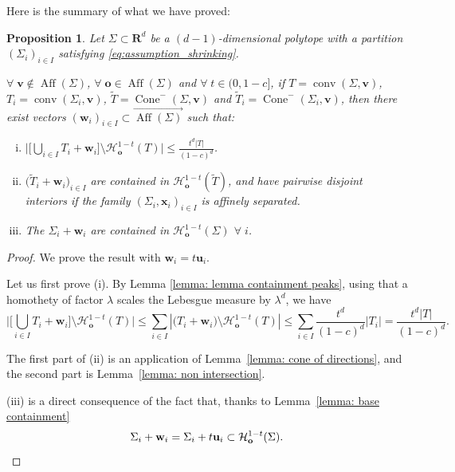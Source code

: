 \documentclass[10pt]{amsart}
\newcommand{\R}{\mathbf{R}}
\newcommand{\ocone}[2]{\operatorname{Cone}^-(#1,#2)}
\newtheorem{proposition}[theorem]{Proposition}
\begin{document}
Here is the summary of what we have proved:
\begin{proposition}\label{prop: base case}
Let $\Sigma \subset \R^d$ be a  $(d-1)$-dimensional polytope with a partition $(\Sigma_i)_{i \in I}$ satisfying \eqref{eq:assumption_shrinking}. 

$ \forall\;\mathbf{v}\notin \operatorname{Aff}(\Sigma)$, $\forall\;\mathbf{o}\in \operatorname{Aff}(\Sigma)$ and $\forall\;t\in (0,1-c]$, if $T=\operatorname{conv}(\Sigma, \mathbf{v})$, $T_i=\operatorname{conv}(\Sigma_i, \mathbf{v})$, $\widetilde{T}=\ocone{\Sigma}{\mathbf{v}}$ and $\widetilde{T}_i=\ocone{\Sigma_i}{\mathbf{v}}$, then there exist vectors $(\mathbf{w}_i)_{i\in I}\subset \overrightarrow{\operatorname{Aff}(\Sigma)}$ such that:
\begin{enumerate}[(i)]
    \item $\displaystyle \bigg|\bigg[\bigcup_{i\in I} T_i+\mathbf{w}_i\bigg]\setminus \mathcal{H}^{1-t}_\mathbf{o}(T)\bigg|\leq \frac{t^d|T|}{(1-c)^d} $.
    \item $\displaystyle \big(\widetilde{T}_i+\mathbf{w}_i\big)_{i\in I}$ are contained in $\mathcal{H}_\mathbf{o}^{1-t}(\widetilde{T})$, and have pairwise disjoint interiors if the family $(\Sigma_i,\mathbf{x}_i)_{i \in I}$ is affinely separated.
    \item The $\Sigma_i+
    \mathbf{w}_i$ are contained in $\mathcal{H}_\mathbf{o}^{1-t}(\Sigma)$ $\forall\;i$.
\end{enumerate}
\end{proposition}
\begin{proof}
We prove the result with $\mathbf{w}_i = t\mathbf{u}_i$.

Let us first prove (i). By Lemma \ref{lemma: lemma containment peaks}, using that a homothety of factor $\lambda$ scales the Lebesgue measure by $\lambda^d$, we have
\begin{equation*}
     \bigg|\bigg[\bigcup_{i\in I} 
     T_i+\mathbf{w}_{i}\bigg]\setminus \mathcal{H}^{1-t}_\mathbf{o}(T)\bigg|\leq \sum_{i\in I}|\big(T_i+\mathbf{w}_{i}\big)\setminus \mathcal{H}^{1-t}_\mathbf{o}(T)|
    \leq \sum_{i\in I} \frac{t^d}{(1-c)^d}|T_i|= \frac{t^d|T|}{(1-c)^d} .
\end{equation*}

The first part of (ii) is an application of Lemma~\ref{lemma: cone of directions}, and the second part is Lemma~\ref{lemma: non intersection}.

(iii) is a direct consequence of the fact that, thanks to Lemma~\ref{lemma: base containment}
\[\Sigma_i+\mathbf{w}_i= \Sigma_{i}+t\mathbf{u}_{i}\subset \mathcal{H}^{1-t}_\mathbf{o}(\Sigma).\qedhere\]
\end{proof}
\end{document}

